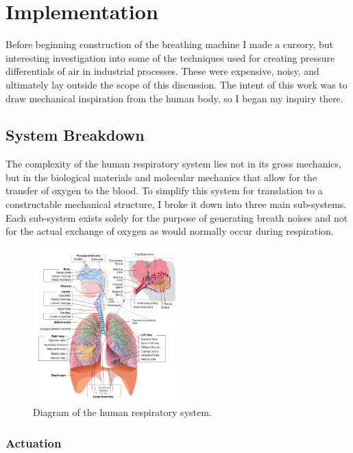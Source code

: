 \documentclass[letterpaper]{article}
\begin{document}
\section{Implementation}

Before beginning construction of the breathing machine I made a cursory, but interesting investigation into some of the techniques used for creating pressure differentials of air in industrial processes. These were expensive, noisy, and ultimately lay outside the scope of this discussion. The intent of this work was to draw mechanical inspiration from the human body, so I began my inquiry there. 

\subsection{System Breakdown}

The complexity of the human respiratory system lies not in its gross mechanics, but in the biological materials and molecular mechanics that allow for the transfer of oxygen to the blood.\cite{gasexchangers} To simplify this system for translation to a constructable mechanical structure, I broke it down into three main sub-systems. Each sub-system exists solely for the purpose of generating breath noises and not for the actual exchange of oxygen as would normally occur during respiration.

\begin{figure}[h]
\includegraphics[width=0.5\textwidth]{images/respiratorysystem.png}
\caption{Diagram of the human respiratory system.}
\end{figure}

\subsubsection{Actuation}
\end{document}
